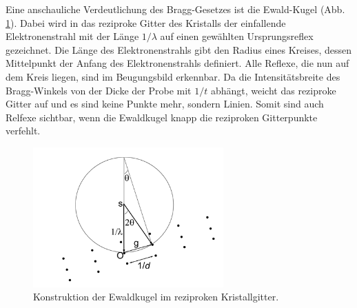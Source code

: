 \documentclass[a4paper,11pt,DIV=11]{scrartcl}
\begin{document}
Eine anschauliche Verdeutlichung des Bragg-Gesetzes ist die Ewald-Kugel (Abb. \ref{ewald}). Dabei wird in das reziproke Gitter des Kristalls der einfallende Elektronenstrahl mit der Länge \(1/\lambda\) auf einen gewählten Ursprungsreflex gezeichnet. Die Länge des Elektronenstrahls gibt den Radius eines Kreises, dessen Mittelpunkt der Anfang des Elektronenstrahls definiert. Alle Reflexe, die nun auf dem Kreis liegen, sind im Beugungsbild erkennbar. Da die Intensitätsbreite des Bragg-Winkels von der Dicke der Probe mit \(1/t\) abhängt, weicht das reziproke Gitter auf und es sind keine Punkte mehr, sondern Linien. Somit sind auch Relfexe sichtbar, wenn die Ewaldkugel knapp die reziproken Gitterpunkte verfehlt.
\begin{figure}\center
\includegraphics[width=0.65\textwidth]{ewald.png}
\caption{Konstruktion der Ewaldkugel im reziproken Kristallgitter.}
\label{ewald}
\end{figure}
	
\end{document}
